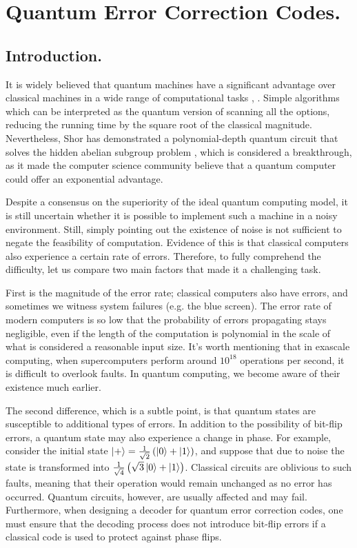 \chapter{Quantum Error Correction Codes.}
\section{Introduction.}
It is widely believed that quantum machines have a significant advantage over classical machines in a wide range of computational tasks \cite{grover1996fast}, \cite{ahuja1999quantum}. Simple algorithms which can be interpreted as the quantum version of scanning all the options, reducing the running time by the square root of the classical magnitude.
Nevertheless, Shor has demonstrated a polynomial-depth quantum circuit that solves the hidden abelian subgroup problem \cite{Shor_1997}, which is considered a breakthrough, as it made the computer science community believe that a quantum computer could offer an exponential advantage.

Despite a consensus on the superiority of the ideal quantum computing model, it is still uncertain whether it is possible to implement such a machine in a noisy environment.
Still, simply pointing out the existence of noise is not sufficient to negate the feasibility of computation. Evidence of this is that classical computers also experience a certain rate of errors. Therefore, to fully comprehend the difficulty, let us compare two main factors that made it a challenging task.


First is the magnitude of the error rate; classical computers also have errors, and sometimes we witness system failures (e.g. the blue screen). The error rate of modern computers is so low that the probability of errors propagating stays negligible, even if the length of the computation is polynomial in the scale of what is considered a reasonable input size. It's worth mentioning that in exascale computing, when supercomputers perform around $10^{18}$ operations per second, it is difficult to overlook faults. In quantum computing, we become aware of their existence much earlier.
 

The second difference, which is a subtle point, is that quantum states are susceptible to additional types of errors. In addition to the possibility of bit-flip errors, a quantum state may also experience a change in phase. For example, consider the initial state $\ket{+} = \frac{1}{\sqrt{2}}\left( \ket{0} + \ket{1} \right)$, and suppose that due to noise the state is transformed into $\frac{1}{\sqrt{4}}\left( \sqrt{3}\ket{0} + \ket{1} \right)$. Classical circuits are oblivious to such faults, meaning that their operation would remain unchanged as no error has occurred. Quantum circuits, however, are usually affected and may fail. Furthermore, when designing a decoder for quantum error correction codes, one must ensure that the decoding process does not introduce bit-flip errors if a classical code is used to protect against phase flips.

